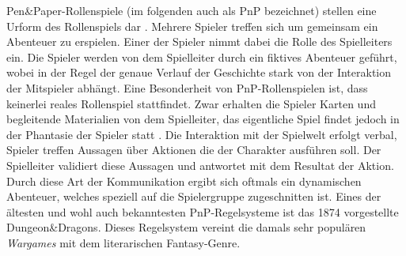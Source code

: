Pen\&Paper-Rollenspiele (im folgenden auch als PnP bezeichnet) stellen eine Urform des Rollenspiels dar \cite{Apperley2006}. Mehrere Spieler treffen sich um gemeinsam ein Abenteuer zu erspielen. Einer der Spieler nimmt dabei die Rolle des Spielleiters ein. Die Spieler werden von dem Spielleiter durch ein fiktives Abenteuer geführt, wobei in der Regel der genaue Verlauf der Geschichte stark von der Interaktion der Mitspieler abhängt. \cite{Apperley2006}\newline 
Eine Besonderheit von PnP-Rollenspielen ist, dass keinerlei reales Rollenspiel stattfindet. Zwar erhalten die Spieler Karten und begleitende Materialien von dem Spielleiter, das eigentliche Spiel findet jedoch in der Phantasie der Spieler statt \cite{Copier2005}. Die Interaktion mit der Spielwelt erfolgt verbal, Spieler treffen Aussagen über Aktionen die der Charakter ausführen soll. Der Spielleiter validiert diese Aussagen und antwortet mit dem Resultat der Aktion. Durch diese Art der Kommunikation ergibt sich oftmals ein dynamischen Abenteuer, welches speziell auf die Spielergruppe zugeschnitten ist. \cite{Drachen2008}\newline
Eines der ältesten und wohl auch bekanntesten PnP-Regelsysteme ist das 1874 vorgestellte Dungeon\&Dragons. Dieses Regelsystem vereint die damals sehr populären \emph{Wargames} mit dem literarischen Fantasy-Genre. \cite{Copier2005}


